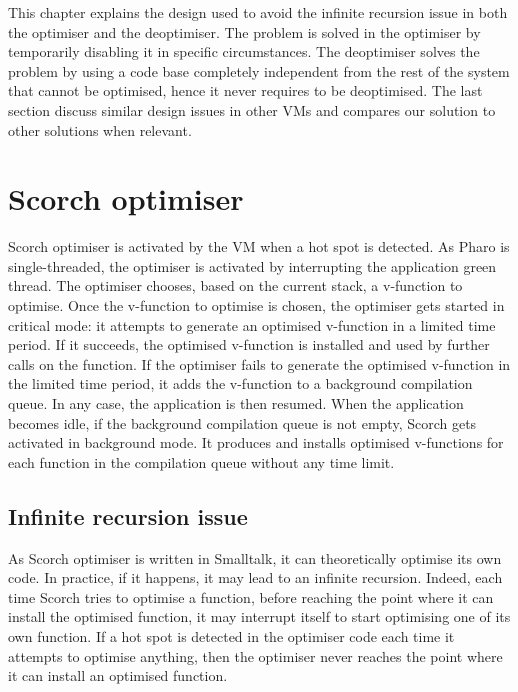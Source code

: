 \documentclass[a4paper,12pt,twoside]{../includes/ThesisStyle}
\begin{document}
This chapter explains the design used to avoid the infinite recursion issue in both the optimiser and the deoptimiser. The problem is solved in the optimiser by temporarily disabling it in specific circumstances. The deoptimiser solves the problem by using a code base completely independent from the rest of the system that cannot be optimised, hence it never requires to be deoptimised. The last section discuss similar design issues in other VMs and compares our solution to other solutions when relevant.


\section{Scorch optimiser}

Scorch optimiser is activated by the VM when a hot spot is detected. As Pharo is single-threaded, the optimiser is activated by interrupting the application green thread. The optimiser chooses, based on the current stack, a v-function to optimise.  Once the v-function to optimise is chosen, the optimiser gets started in critical mode: it attempts to generate an optimised v-function in a limited time period. If it succeeds, the optimised v-function is installed and used by further calls on the function. If the optimiser fails to generate the optimised v-function in the limited time period, it adds the v-function to a background compilation queue. In any case, the application is then resumed. When the application becomes idle, if the background compilation queue is not empty, Scorch gets activated in background mode. It produces and installs optimised v-functions for each function in the compilation queue without any time limit. 

\subsection{Infinite recursion issue}

As Scorch optimiser is written in Smalltalk, it can theoretically optimise its own code. In practice, if it happens, it may lead to an infinite recursion. Indeed, each time Scorch tries to optimise a function, before reaching the point where it can install the optimised function, it may interrupt itself to start optimising one of its own function. If a hot spot is detected in the optimiser code each time it attempts to optimise anything, then the optimiser never reaches the point where it can install an optimised function.
\end{document}
